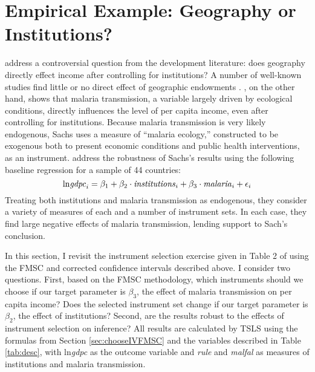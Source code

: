 \section{Empirical Example: Geography or Institutions?}
\label{sec:application}
\cite{Carstensen2006} address a controversial question from the development literature: does geography directly effect income after controlling for institutions? 
A number of well-known studies find little or no direct effect of geographic endowments \citep{Acemoglu,Rodrik,Easterly}. \cite{Sachs}, on the other hand, shows that malaria transmission, a variable largely driven by ecological conditions, directly influences the level of per capita income, even after controlling for institutions. Because malaria transmission is very likely endogenous, Sachs uses a measure of ``malaria ecology,'' constructed to be exogenous both to present economic conditions and public health interventions, as an instrument. 
\cite{Carstensen2006} address the robustness of Sachs's results using the following baseline regression for a sample of 44 countries:
\begin{equation}
	\mbox{ln\emph{gdpc}}_i = \beta_1 + \beta_2 \cdot \mbox{\emph{institutions}}_i + \beta_3 \cdot \mbox{\emph{malaria}}_i + \epsilon_i
\end{equation}
Treating both institutions and malaria transmission as endogenous, they consider a variety of measures of each and a number of instrument sets. 
In each case, they find large negative effects of malaria transmission, lending support to Sach's conclusion.

In this section, I revisit the instrument selection exercise given in Table 2 of \cite{Carstensen2006} using the FMSC and corrected confidence intervals described above. I consider two questions. 
First, based on the FMSC methodology, which instruments should we choose if our target parameter is $\beta_3$, the effect of malaria transmission on per capita income?
Does the selected instrument set change if our target parameter is $\beta_2$, the effect of institutions?
Second, are the results robust to the effects of instrument selection on inference?
All results are calculated by TSLS using the formulas from Section \ref{sec:chooseIVFMSC} and the variables described in Table \ref{tab:desc}, with ln\emph{gdpc} as the outcome  variable and \emph{rule} and \emph{malfal} as measures of institutions and malaria transmission.


